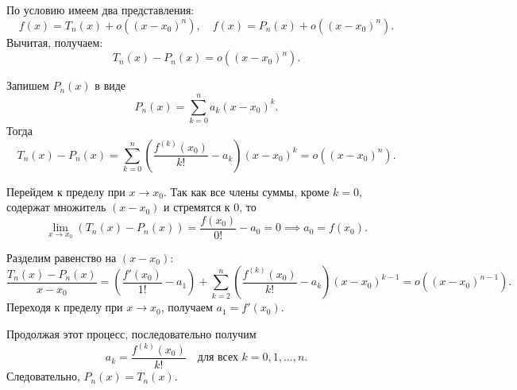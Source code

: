 \begin{Proof}
    По условию имеем два представления:
    \[
    f(x) = T_n(x) + o((x - x_0)^n), \quad
    f(x) = P_n(x) + o((x - x_0)^n).
    \]
    Вычитая, получаем:
    \[
    T_n(x) - P_n(x) = o((x - x_0)^n).
    \]
    
    Запишем \(P_n(x)\) в виде 
    \[
    P_n(x) = \sum_{k=0}^n a_k (x - x_0)^k.
    \]
    Тогда
    \[
    T_n(x) - P_n(x) = \sum_{k=0}^n \left( \frac{f^{(k)}(x_0)}{k!} - a_k \right) (x - x_0)^k = o((x - x_0)^n).
    \]
    
    Перейдем к пределу при \(x \to x_0\). Так как все члены суммы, кроме \(k = 0\), содержат множитель \((x - x_0)\) и стремятся к 0, то
    \[
    \lim_{x \to x_0} (T_n(x) - P_n(x)) = \frac{f(x_0)}{0!} - a_0 = 0 \implies a_0 = f(x_0).
    \]
    
    Разделим равенство на \((x - x_0)\):
    \[
    \frac{T_n(x) - P_n(x)}{x - x_0} = \left( \frac{f'(x_0)}{1!} - a_1 \right) + \sum_{k=2}^n \left( \frac{f^{(k)}(x_0)}{k!} - a_k \right) (x - x_0)^{k-1} = o((x - x_0)^{n-1}).
    \]
    Переходя к пределу при \(x \to x_0\), получаем \(a_1 = f'(x_0)\).
    
    Продолжая этот процесс, последовательно получим
    \[
    a_k = \frac{f^{(k)}(x_0)}{k!} \quad \text{для всех } k = 0, 1, \dots, n.
    \]
    Следовательно, \(P_n(x) = T_n(x)\).
\end{Proof}
